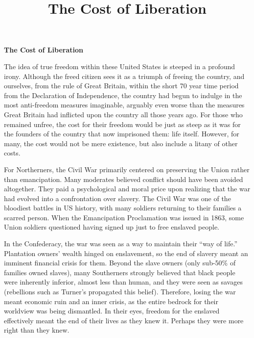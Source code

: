\documentclass[12pt]{article}
\begin{document}
\title{The Cost of Liberation}
\author{ }
\date{ }
\maketitle

\noindent
\textbf{The Cost of Liberation}

\medskip

The idea of true freedom within these United States is steeped in a profound irony. Although the freed citizen sees it as a triumph of freeing the country, and ourselves, from the rule of Great Britain, within the short 70 year time period from the Declaration of Independence, the country had begun to indulge in the most anti-freedom measures imaginable, arguably even worse than the measures Great Britain had inflicted upon the country all those years ago. For those who remained unfree, the cost for their freedom would be just as steep as it was for the founders of the country that now imprisoned them: life itself. However, for many, the cost would not be mere existence, but also include a litany of other costs.\cite{Foner1999, Berlin1998}

\medskip

For Northerners, the Civil War primarily centered on preserving the Union rather than emancipation. Many moderates believed conflict should have been avoided altogether. They paid a psychological and moral price upon realizing that the war had evolved into a confrontation over slavery.\cite{McPherson1988} The Civil War was one of the bloodiest battles in US history, with many soldiers returning to their families a scarred person.\cite{Faust2009} When the Emancipation Proclamation was issued in 1863, some Union soldiers questioned having signed up just to free enslaved people.\cite{Lincoln1863,McPhersonFreed}

\medskip

In the Confederacy, the war was seen as a way to maintain their “way of life.” Plantation owners’ wealth hinged on enslavement, so the end of slavery meant an imminent financial crisis for them.\cite{Phillips1929,Wright1978} Beyond the slave owners (only sub-50\% of families owned slaves), many Southerners strongly believed that black people were inherently inferior, almost less than human, and they were seen as savages (rebellions such as Turner’s propagated this belief).\cite{1860Census,Stampp1956} Therefore, losing the war meant economic ruin and an inner crisis, as the entire bedrock for their worldview was being dismantled. In their eyes, freedom for the enslaved effectively meant the end of their lives as they knew it. Perhaps they were more right than they knew.
\end{document}
